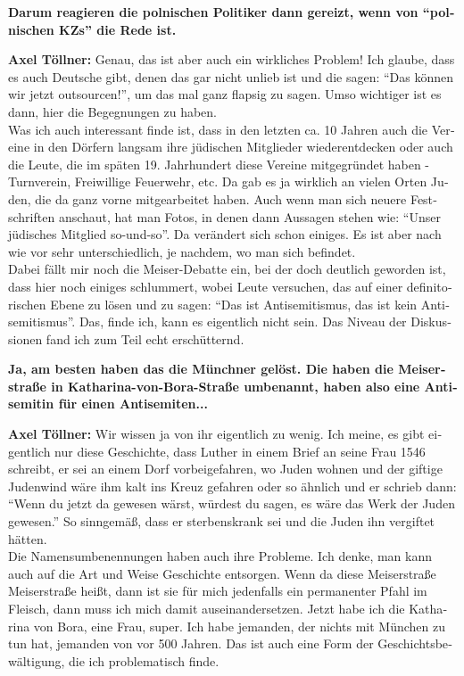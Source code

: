 \begin{otherlanguage}{ngerman}
\textbf{Darum reagieren die polnischen Politiker dann gereizt, wenn von "`polnischen KZs"' die Rede ist.} 

\textbf{Axel Töllner:} Genau, das ist aber auch ein wirkliches Problem! Ich glaube, dass es auch Deutsche gibt, denen das gar nicht unlieb ist und die sagen: "`Das können wir jetzt outsourcen!"', um das mal ganz flapsig zu sagen. Umso wichtiger ist es dann, hier die Begegnungen zu haben.\\
Was ich auch interessant finde ist, dass in den letzten ca. 10 Jahren auch die Vereine in den Dörfern langsam ihre jüdischen Mitglieder wiederentdecken oder auch die Leute, die im späten 19. Jahrhundert diese Vereine mitgegründet haben - Turnverein, Freiwillige Feuerwehr, etc. Da gab es ja wirklich an vielen Orten Juden, die da ganz vorne mitgearbeitet haben. Auch wenn man sich neuere Festschriften anschaut, hat man Fotos, in denen dann Aussagen stehen wie: "`Unser jüdisches Mitglied so-und-so"'. Da verändert sich schon einiges. Es ist aber nach wie vor sehr unterschiedlich, je nachdem, wo man sich befindet.\\
Dabei fällt mir noch die Meiser-Debatte ein, bei der doch deutlich geworden ist, dass hier noch einiges schlummert, wobei Leute versuchen, das auf einer definitorischen Ebene zu lösen und zu sagen: "`Das ist Antisemitismus, das ist kein Antisemitismus"'. Das, finde ich, kann es eigentlich nicht sein. Das Niveau der Diskussionen fand ich zum Teil echt erschütternd. 

\textbf{Ja, am besten haben das die Münchner gelöst. Die haben die Meiserstraße in Katharina-von-Bora-Straße umbenannt, haben also eine Antisemitin für einen Antisemiten...} 

\textbf{Axel Töllner:} Wir wissen ja von ihr eigentlich zu wenig. Ich meine, es gibt eigentlich nur diese Geschichte, dass Luther in einem Brief an seine Frau 1546 schreibt, er sei an einem Dorf vorbeigefahren, wo Juden wohnen und der giftige Judenwind wäre ihm kalt ins Kreuz gefahren oder so ähnlich und er schrieb dann: "`Wenn du jetzt da gewesen wärst, würdest du sagen, es wäre das Werk der Juden gewesen."' So sinngemäß,  dass er sterbenskrank sei und die Juden ihn vergiftet hätten.\\
Die Namensumbenennungen haben auch ihre Probleme. Ich denke, man kann auch auf die Art und Weise Geschichte entsorgen. Wenn da diese Meiserstraße Meiserstraße heißt, dann ist sie für mich jedenfalls ein permanenter Pfahl im Fleisch, dann muss ich mich damit auseinandersetzen. Jetzt habe ich die Katharina von Bora, eine Frau, super. Ich habe jemanden, der nichts mit München zu tun hat, jemanden von vor 500 Jahren. Das ist auch eine Form der Geschichtsbewältigung, die ich problematisch finde. 


\end{otherlanguage}
